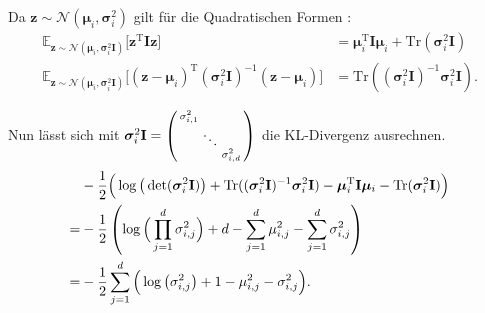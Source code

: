 \documentclass[12pt]{article}
\newcommand{\z}{\mathbf{z}}
\begin{document}
	Da $\z\sim\mathcal{N}(\boldsymbol\mu_{i},\boldsymbol\sigma_{i}^{2})$ gilt für die Quadratischen Formen \cite{matrix}:
	\begin{align*}
	\mathbb{E}_{\z\sim\mathcal{N}(\boldsymbol\mu_{i},\boldsymbol\sigma_{i}^{2}\mathbf{I})}\big[\textbf{z}^{\mathrm{T}}\mathbf{I}\textbf{z}\big] &= \boldsymbol\mu_{i}^{\mathrm{T}}\mathbf{I}\boldsymbol\mu_{i}+\mathrm{Tr}(\boldsymbol\sigma_{i}^{2}\mathbf{I})\\ \mathbb{E}_{\z\sim\mathcal{N}(\boldsymbol\mu_{i},\boldsymbol\sigma_{i}^{2}\mathbf{I})}\big[(\textbf{z}-\boldsymbol\mu_{i})^{\mathrm{T}}(\boldsymbol\sigma_{i}^{2}\mathbf{I})^{-1}(\textbf{z}-\boldsymbol\mu_{i})\big] &= \mathrm{Tr}((\boldsymbol\sigma_{i}^{2}\mathbf{I})^{-1}\boldsymbol\sigma_{i}^{2}\mathbf{I}).
	\end{align*}


	Nun lässt sich mit ${\boldsymbol\sigma_{i}^{2}\mathbf{I}} =  \begin{psmallmatrix}\sigma_{i,1}^{2} & \ &\ \\ \ & \ddots &\ \\ \ & \ &\sigma_{i,d}^{2}\end{psmallmatrix}$ die KL-Divergenz ausrechnen.
	\begin{align*}
	&-\frac{1}{2}\Big(\log\big(\det(\boldsymbol\sigma_{i}^{2}\mathbf{I})\big)+\mathrm{Tr}((\boldsymbol\sigma_{i}^{2}\mathbf{I})^{-1}\boldsymbol\sigma_{i}^{2}\mathbf{I})-\boldsymbol\mu_{i}^{\mathrm{T}}\textbf{I}\boldsymbol\mu_{i}-\mathrm{Tr}(\boldsymbol\sigma_{i}^{2}\mathbf{I})\Big) \notag \\
	= &-\frac{1}{2}\left(\log\Big(\prod_{j=1}^{d}\sigma_{i,j}^{2}\Big)+d-\sum_{j=1}^{d}\mu_{i,j}^{2}-\sum_{j=1}^{d}\sigma_{i,j}^{2}\right) \notag \\
	= &-\frac{1}{2}\sum_{j=1}^{d}\Big(\log\big(\sigma_{i,j}^{2}\big)+1-\mu_{i,j}^{2}-\sigma_{i,j}^{2}\Big).
	\end{align*}
\end{document}

